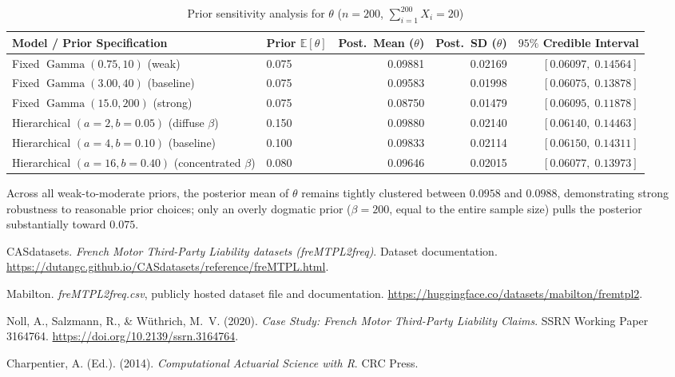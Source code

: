 \documentclass[11pt,a4paper]{article}
\begin{document}
\begin{table}[ht]
\centering
\caption{Prior sensitivity analysis for $\theta$ ($n = 200$, $\sum_{i=1}^{200} X_i = 20$)}
\label{tab:sensitivity}
\begin{tabular}{llrrr}
\toprule
Model / Prior Specification & Prior $\mathbb{E}[\theta]$ & Post.\ Mean ($\theta$) & Post.\ SD ($\theta$) & $95\%$ Credible Interval \\
\midrule
Fixed $\operatorname{Gamma}(0.75, 10)$ (weak) & 0.075 & 0.09881 & 0.02169 & $[0.06097,\; 0.14564]$ \\
Fixed $\operatorname{Gamma}(3.00, 40)$ (baseline) & 0.075 & 0.09583 & 0.01998 & $[0.06075,\; 0.13878]$ \\
Fixed $\operatorname{Gamma}(15.0, 200)$ (strong) & 0.075 & 0.08750 & 0.01479 & $[0.06095,\; 0.11878]$ \\
\midrule
Hierarchical $(a=2, b=0.05)$ (diffuse $\beta$) & 0.150 & 0.09880 & 0.02140 & $[0.06140,\; 0.14463]$ \\
Hierarchical $(a=4, b=0.10)$ (baseline) & 0.100 & 0.09833 & 0.02114 & $[0.06150,\; 0.14311]$ \\
Hierarchical $(a=16, b=0.40)$ (concentrated $\beta$) & 0.080 & 0.09646 & 0.02015 & $[0.06077,\; 0.13973]$ \\
\bottomrule
\end{tabular}
\end{table}

Across all weak-to-moderate priors, the posterior mean of $\theta$ remains tightly clustered between $0.0958$ and $0.0988$, demonstrating strong robustness to reasonable prior choices; only an overly dogmatic prior ($\beta = 200$, equal to the entire sample size) pulls the posterior substantially toward $0.075$.

\begin{thebibliography}{9}
CASdatasets. \emph{French Motor Third-Party Liability datasets (freMTPL2freq)}. Dataset documentation. \url{https://dutangc.github.io/CASdatasets/reference/freMTPL.html}.

Mabilton. \emph{freMTPL2freq.csv}, publicly hosted dataset file and documentation. \url{https://huggingface.co/datasets/mabilton/fremtpl2}.

Noll, A., Salzmann, R., \& W\"uthrich, M.~V. (2020). \emph{Case Study: French Motor Third-Party Liability Claims}. SSRN Working Paper 3164764. \url{https://doi.org/10.2139/ssrn.3164764}.

Charpentier, A. (Ed.). (2014). \emph{Computational Actuarial Science with R}. CRC Press.
\end{thebibliography}
\end{document}
